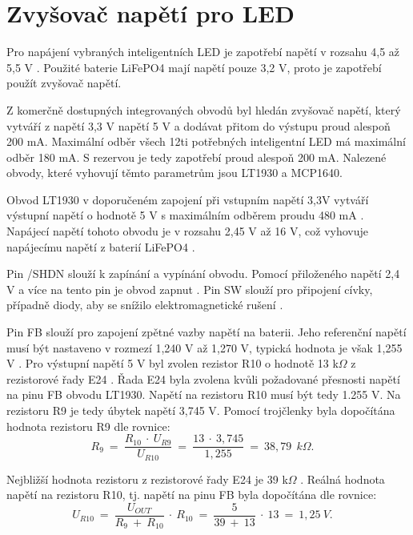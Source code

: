 \section{Zvyšovač napětí pro LED}
Pro napájení vybraných inteligentních LED je zapotřebí napětí v rozsahu 4,5 až 5,5 V \cite{WS2812C_dtsh}. Použité baterie LiFePO4 mají napětí pouze 3,2 V, proto je 
zapotřebí použít zvyšovač napětí. 

Z komerčně dostupných integrovaných obvodů byl hledán zvyšovač napětí, který vytváří z napětí 3,3 V napětí 5 V a dodávat přitom do výstupu proud alespoň 200 mA. 
Maximální odběr všech 12ti potřebných inteligentní LED má maximální odběr 180 mA. S rezervou je tedy zapotřebí proud alespoň 200 mA. Nalezené obvody, které vyhovují 
těmto parametrům jsou LT1930 a MCP1640. 

Obvod LT1930 v doporučeném zapojení při vstupním napětí 3,3V vytváří výstupní napětí o hodnotě 5 V s maximálním odběrem proudu 480 mA \cite{LT1930_dtsh}. Napájecí napětí 
tohoto obvodu je v rozsahu 2,45 V až 16 V, což vyhovuje napájecímu napětí z baterií LiFePO4 \cite{LT1930_dtsh}.



Pin /SHDN slouží k zapínání a vypínání obvodu. Pomocí přiloženého napětí 2,4 V a více na tento pin je obvod zapnut \cite{LT1930_dtsh}. Pin SW slouží pro  připojení cívky, 
případně diody, aby se snížilo elektromagnetické rušení \cite{LT1930_dtsh}. 

Pin FB slouží  pro zapojení zpětné vazby napětí na baterii. Jeho referenční napětí musí být nastaveno v rozmezí 1,240 V až 1,270 V, typická hodnota je však 1,255 V \cite{LT1930_dtsh}. 
Pro výstupní napětí 5 V byl zvolen rezistor R10 o hodnotě 13 k$\Omega$ z rezistorové řady E24 \cite{rezistorova_rada}. Řada E24 byla zvolena kvůli požadované přesnosti
napětí na pinu FB obvodu LT1930. Napětí na rezistoru R10 musí být tedy 1.255 V. Na rezistoru R9 je tedy úbytek napětí 3,745 V. Pomocí trojčlenky byla dopočítána hodnota 
rezistoru R9 dle rovnice:
\begin{equation} 
  R_{9}~=~\frac{R_{10}~\cdot~U_{R9}}{U_{R10}}~=~\frac{13~\cdot~3,745}{1,255}~=~38,79~\:k\Omega. 
  \quad
\label{eq:R9}
\end{equation}

Nejbližší hodnota rezistoru z rezistorové řady E24 je 39 k$\Omega$ \cite{rezistorova_rada}. Reálná hodnota napětí na rezistoru R10, tj. napětí na pinu FB byla dopočítána
dle rovnice:
\begin{equation} 
  U_{R10}~=~\frac{U_{OUT}}{R_{9}~+~R_{10}}~\cdot~R_{10}~=~\frac{5}{39~+~13}~\cdot~13~=~1,25~V. 
  \quad
\label{eq:UR10}
\end{equation}

